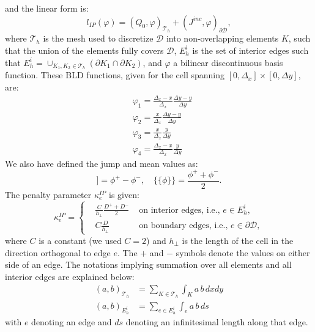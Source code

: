 \documentclass{mc2013}
\newcommand{\jmp}[1]{[\![#1]\!]}                     %
\newcommand{\mvl}[1]{\{\!\!\{#1\}\!\!\}}             %
\newcommand\tf{\varphi}
\newcommand\mc{\mathcal}
\renewcommand{\(}{\left(}
\renewcommand{\)}{\right)}
\renewcommand{\[}{\left[}
\renewcommand{\]}{\right]}
\begin{document}
and the linear form is:
\begin{equation}
\label{eq:rhs-ip-form}
  l_{IP}(\tf) = \(Q_0,\tf\)_{\mc{T}_h} + (J^{inc},\tf)_{\partial \mc{D}},
\end{equation}
%
%
where $\mc{T}_h$ is the mesh used to discretize $\mc{D}$ into non-overlapping 
elements $K$, such that the union of the elements fully covers $\mc{D}$, $E_h^i$ is 
the set of interior edges such that $E_h^i= \cup _{K_1,K_2\in \mc{T}_h}(\partial K_1 \cap \partial K_2)$,
and $\tf$ a bilinear discontinuous basis function. These BLD functions, given for the cell spanning 
$[0,{\Delta _x}]\times[0, \Delta y]$, are:
\begin{align*}
& \tf_1 = \frac{{\Delta _x}-x}{{\Delta _x}}\frac{\Delta y-y}{\Delta y}\\
& \tf_2 = \frac{x}{{\Delta _x}} \frac{\Delta y-y}{\Delta y}\\
& \tf_3 = \frac{x}{{\Delta _x}}\frac{y}{\Delta y}\\
& \tf_4 = \frac{{\Delta _x}-x}{{\Delta _x}}\frac{y}{\Delta y}
\end{align*}
We also have defined the jump and mean values as:
\begin{equation}
  \jmp{\phi} = \phi^+ - \phi^-,\quad
  \mvl{\phi} =  \frac{\phi^++\phi^-}{2}.
\end{equation}
The penalty parameter $\kappa_e^{IP}$ is given:
\begin{equation}
\label{eq:penalty-ip}
  \kappa_e^{IP} = \left\{
    \begin{aligned}
      & \frac{C}{h_{\bot}} \frac{D^+ +D^-}{2} & \textrm{ on interior edges, i.e., } e \in  E_h^i,\\
      & C\frac{D}{h_{\bot}} & \textrm{ on boundary edges, i.e., } e \in \partial \mc{D},
    \end{aligned}
    \right.
\end{equation}
where $C$ is a constant (we used $C=2$) and $h_{\bot}$ is the
length of the cell in the direction orthogonal to edge $e$.  The $+$ and $-$
symbols denote the values on either side of an edge. 
The notations implying summation over all elements and all interior edges are explained below: 
\begin{align*}
\(a,b\)_{\mc{T}_h} &= \sum_{K \in \mc{T}_h } \int_K a\,b\,dxdy \\
\(a,b\)_{E_h^i}    &= \sum_{e \in E_h^i } \int_e a\,b \,ds
\end{align*}
with $e$ denoting an edge and $ds$ denoting an infinitesimal length along that edge.\\
\end{document}
